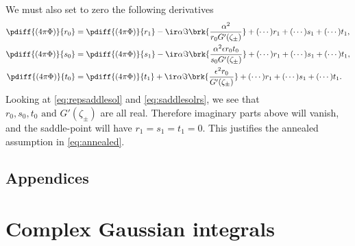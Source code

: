 \documentclass[12pt]{article}
\begin{document}
We must also set to zero the following derivatives
%
\begin{equation}\label{eq:phidiff0}
\begin{aligned}
  \pdiff{(4\pi\Phi)}{r_0} &= \pdiff{(4\pi\Phi)}{r_1} - \ir\alpha\Im\brk{\frac{\alpha^2}{r_0G'(\zeta_\pm)}}
  +(\cdots)r_1+(\cdots)s_1+(\cdots)t_1,  \\
  \pdiff{(4\pi\Phi)}{s_0} &= \pdiff{(4\pi\Phi)}{s_1} - \ir\alpha\Im\brk{\frac{\alpha^2\epsilon r_0 t_0}{s_0G'(\zeta_\pm)}}
  +(\cdots)r_1+(\cdots)s_1+(\cdots)t_1,  \\
  \pdiff{(4\pi\Phi)}{t_0} &= \pdiff{(4\pi\Phi)}{t_1} + \ir\alpha\Im\brk{\frac{\epsilon^2r_0}{G'(\zeta_\pm)}}
  +(\cdots)r_1+(\cdots)s_1+(\cdots)t_1.
\end{aligned}
\end{equation}
%
Looking at \eqref{eq:repsaddlesol} and \eqref{eq:saddlesolrs}, we see that $r_0,s_0,t_0\text{ and }G'(\zeta_\pm)$ are all real.
Therefore imaginary parts above will vanish, and the saddle-point will have $r_1=s_1=t_1=0$.
This justifies the annealed assumption in \eqref{eq:annealed}.





\subsection*{Appendices}
\appendix

\section{Complex Gaussian integrals}\label{sec:compgauss}
\end{document}
